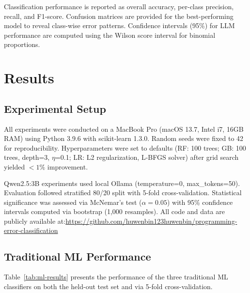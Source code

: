 \documentclass[acmsmall]{acmart}
\begin{document}
Classification performance is reported as overall accuracy, per-class
precision, recall, and F1-score. Confusion matrices are provided for the
best-performing model to reveal class-wise error patterns. Confidence
intervals (95\%) for LLM performance are computed using the Wilson score
interval for binomial proportions.

\section{Results}

\subsection{Experimental Setup}

All experiments were conducted on a MacBook Pro (macOS 13.7, Intel i7, 16GB
RAM) using Python 3.9.6 with scikit-learn 1.3.0. Random seeds were fixed to
42 for reproducibility. Hyperparameters were set to defaults (RF: 100 trees;
GB: 100 trees, depth=3, $\eta$=0.1; LR: L2 regularization, L-BFGS solver)
after grid search yielded $<1\%$ improvement.

Qwen2.5:3B experiments used local Ollama (temperature=0,
max\_tokens=50). Evaluation followed stratified 80/20 split with 5-fold
cross-validation. Statistical significance was assessed via McNemar's test
($\alpha=0.05$) with 95\% confidence intervals computed via bootstrap (1,000
resamples). All code and data are publicly available
at:\url{https://github.com/huwenbin123huwenbin/programming-error-classification}

\subsection{Traditional ML Performance}

Table~\ref{tab:ml-results} presents the performance of the three traditional
ML classifiers on both the held-out test set and via 5-fold cross-validation.
\end{document}
